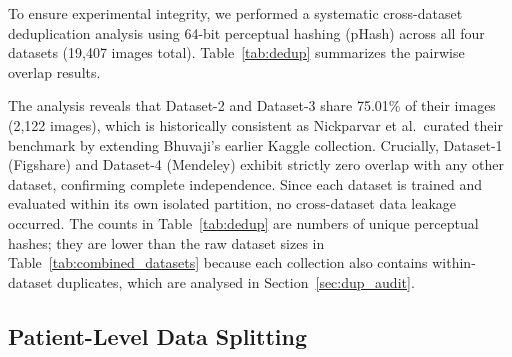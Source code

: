 \documentclass[a4paper,fleqn]{cas-sc}
\begin{document}
To ensure experimental integrity, we performed a systematic cross-dataset deduplication analysis using 64-bit perceptual hashing (pHash) across all four datasets (19,407 images total). Table~\ref{tab:dedup} summarizes the pairwise overlap results.

\begin{table}[!htbp]
\centering
\caption{Cross-Dataset Deduplication Analysis Using Perceptual Hashing (image counts are numbers of unique pHash values per dataset)}
\label{tab:dedup}
\small
{}
\end{table}

The analysis reveals that Dataset-2 and Dataset-3 share 75.01\% of their images (2,122 images), which is historically consistent as Nickparvar et al.\ curated their benchmark by extending Bhuvaji's earlier Kaggle collection. Crucially, Dataset-1 (Figshare) and Dataset-4 (Mendeley) exhibit strictly zero overlap with any other dataset, confirming complete independence. Since each dataset is trained and evaluated within its own isolated partition, no cross-dataset data leakage occurred. The counts in Table~\ref{tab:dedup} are numbers of unique perceptual hashes; they are lower than the raw dataset sizes in Table~\ref{tab:combined_datasets} because each collection also contains within-dataset duplicates, which are analysed in Section~\ref{sec:dup_audit}.

\subsection{Patient-Level Data Splitting}
\label{sec:patient_split}
\end{document}
